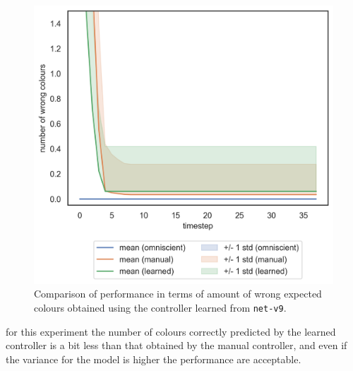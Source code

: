 \begin{figure}[H]
\centering
\includegraphics[width=.5\textwidth]{contents/images/net-v9/colours-errors-compressed}%
\caption[Evaluation of \texttt{net-v9} amount of wrong expected 
colours.]{Comparison of performance in terms of amount of wrong expected 
	colours obtained using the controller learned from \texttt{net-v9}.}
\label{fig:net-v9error}
\end{figure}

\noindent
for this experiment the number of colours correctly predicted by the learned 
controller is a bit less than that obtained by the manual controller, and even if the 
variance for the model is higher the performance are acceptable.

